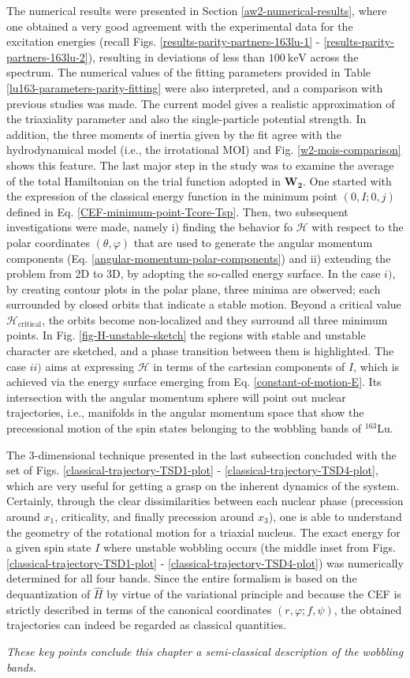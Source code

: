 The numerical results were presented in Section \ref{aw2-numerical-results}, where one obtained a very good agreement with the experimental data for the excitation energies (recall Figs. \ref{results-parity-partners-163lu-1} - \ref{results-parity-partners-163lu-2}), resulting in deviations of less than $100\ \text{keV}$ across the spectrum. The numerical values of the fitting parameters provided in Table \ref{lu163-parameters-parity-fitting} were also interpreted, and a comparison with previous studies was made. The current model gives a realistic approximation of the triaxiality parameter and also the single-particle potential strength. In addition, the three moments of inertia given by the fit agree with the hydrodynamical model (i.e., the irrotational MOI) and Fig. \ref{w2-mois-comparison} shows this feature. The last major step in the study was to examine the average of the total Hamiltonian on the trial function adopted in $\mathbf{W_2}$. One started with the expression of the classical energy function in the minimum point $(0,I;0,j)$ defined in Eq. \ref{CEF-minimum-point-Tcore-Tsp}. Then, two subsequent investigations were made, namely i) finding the behavior fo $\mathcal{H}$ with respect to the polar coordinates $(\theta,\varphi)$ that are used to generate the angular momentum components (Eq. \ref{angular-momentum-polar-components}) and ii) extending the problem from 2D to 3D, by adopting the so-called energy surface. In the case $i)$, by creating contour plots in the polar plane, three minima are observed; each surrounded by closed orbits that indicate a stable motion. Beyond a critical value $\mathcal{H}_\text{critical}$, the orbits become non-localized and they surround all three minimum points. In Fig. \ref{fig-H-unstable-sketch} the regions with stable and unstable character are sketched, and a phase transition between them is highlighted. The case $ii)$ aims at expressing $\mathcal{H}$ in terms of the cartesian components of $I$, which is achieved via the energy surface emerging from Eq. \ref{constant-of-motion-E}. Its intersection with the angular momentum sphere will point out nuclear trajectories, i.e., manifolds in the angular momentum space that show the precessional motion of the spin states belonging to the wobbling bands of $^{163}$Lu.

The 3-dimensional technique presented in the last subsection concluded with the set of Figs. \ref{classical-trajectory-TSD1-plot} - \ref{classical-trajectory-TSD4-plot}, which are very useful for getting a grasp on the inherent dynamics of the system. Certainly, through the clear dissimilarities between each nuclear phase (precession around $x_1$, criticality, and finally precession around $x_3$), one is able to understand the geometry of the rotational motion for a triaxial nucleus. The exact energy for a given spin state $I$ where unstable wobbling occurs (the middle inset from Figs. \ref{classical-trajectory-TSD1-plot} - \ref{classical-trajectory-TSD4-plot}) was numerically determined for all four bands. Since the entire formalism is based on the dequantization of $\hat{H}$ by virtue of the variational principle and because the CEF is strictly described in terms of the canonical coordinates $(r,\varphi;f,\psi)$, the obtained trajectories can indeed be regarded as classical quantities.

\emph{These key points conclude this chapter a semi-classical description of the wobbling bands.}